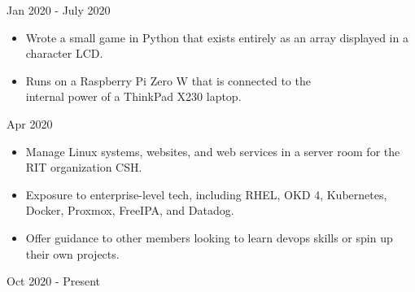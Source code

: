 \documentclass[11pt,letterpaper,ragged2e]{altacv}
\begin{document}
{Jan 2020 - July 2020}

{
\begin{itemize}
    \item Wrote a small game in Python that exists entirely as an array displayed in a character LCD.
    \item Runs on a Raspberry Pi Zero W that is connected to the \\ internal power of a ThinkPad X230 laptop.
\end{itemize}
}
{Apr 2020} \


{
\begin{itemize}
    \item Manage Linux systems, websites, and web services in a server room for the RIT organization CSH.
    \item Exposure to enterprise-level tech, including RHEL, OKD 4, Kubernetes, Docker, Proxmox, FreeIPA, and Datadog.
    \item Offer guidance to other members looking to learn devops skills or spin up their own projects.
\end{itemize}
}
{Oct 2020 - Present}

\clearpage

\nocite{*}
\end{document}
